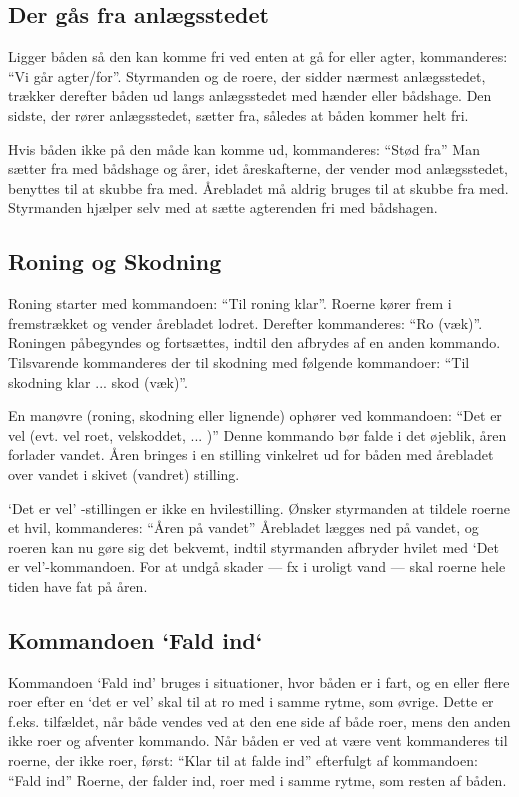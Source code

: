 \documentclass{article}
\begin{document}
\subsection{Der gås fra anlægsstedet}

Ligger båden så den kan komme fri ved enten at gå for eller agter,
kommanderes: ``Vi går agter/for''.  Styrmanden og de roere, der sidder
nærmest anlægsstedet, trækker derefter båden ud langs anlægsstedet med
hænder eller bådshage. Den sidste, der rører anlægsstedet, sætter fra,
således at båden kommer helt fri.

Hvis båden ikke på den måde kan komme ud, kommanderes: ``Stød fra'' Man
sætter fra med bådshage og årer, idet åreskafterne, der vender mod
anlægsstedet, benyttes til at skubbe fra med. Årebladet må aldrig bruges
til at skubbe fra med. Styrmanden hjælper selv med at sætte agterenden
fri med bådshagen.

\subsection{Roning og Skodning}

Roning starter med kommandoen: ``Til roning klar''.  Roerne kører frem i
fremstrækket og vender årebladet lodret.  Derefter kommanderes: ``Ro
(væk)''.  Roningen påbegyndes og fortsættes, indtil den afbrydes af en
anden kommando.  Tilsvarende kommanderes der til skodning med følgende
kommandoer: ``Til skodning klar ... skod (væk)''.

En manøvre (roning, skodning eller lignende) ophører ved kommandoen:
``Det er vel (evt. vel roet, velskoddet, ... )'' Denne kommando bør falde i
det øjeblik, åren forlader vandet. Åren bringes i en stilling vinkelret
ud for båden med årebladet over vandet i skivet (vandret) stilling.

`Det er vel' -stillingen er ikke en hvilestilling. Ønsker styrmanden at
tildele roerne et hvil, kommanderes: ``Åren på vandet'' Årebladet lægges
ned på vandet, og roeren kan nu gøre sig det bekvemt, indtil styrmanden
afbryder hvilet med `Det er vel'-kommandoen. For at undgå skader --- fx i
uroligt vand --- skal roerne hele tiden have fat på åren.

\subsection{Kommandoen `Fald ind`}

Kommandoen `Fald ind' bruges i situationer, hvor båden er i fart, og en
eller flere roer efter en `det er vel' skal til at ro med i samme rytme,
som øvrige. Dette er f.eks. tilfældet, når både vendes ved at den ene
side af både roer, mens den anden ikke roer og afventer kommando. Når
båden er ved at være vent kommanderes til roerne, der ikke roer, først:
``Klar til at falde ind'' efterfulgt af kommandoen: ``Fald ind'' Roerne,
der falder ind, roer med i samme rytme, som resten af båden.
\end{document}
